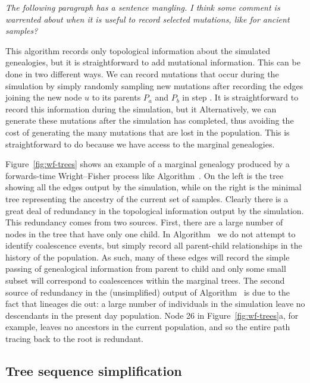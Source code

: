 \documentclass{article}
\newcommand{\krt}[1]{{\em \color{green} #1}}
\begin{document}
\krt{The following paragraph has a sentence mangling.  I think some comment is warrented about when it is useful to
record selected mutations, like for ancient samples?}

This algorithm records only topological information about the simulated genealogies,
but it is straightforward to add mutational information.
This can be done in two different ways.
We can record mutations that occur during the simulation by simply
randomly sampling new mutations after recording the edges joining the new node $u$ to its parents
$P_a$ and $P_b$ in step .
It is straightforward to record this information during the simulation, but it
Alternatively, we can generate these mutations after the simulation has completed, thus
avoiding the cost of generating the many mutations that are lost in the population.
This is straightforward to do because we have access to the marginal genealogies.

Figure~\ref{fig:wf-trees} shows
an example of a marginal genealogy produced by a forwards-time Wright--Fisher
process like Algorithm~.
On the left is the tree showing all the edges output by the simulation,
while on the right
is the minimal tree representing the ancestry of the current set of samples.
Clearly there is a great deal of redundancy in the topological
information output by the simulation.
This redundancy comes from two sources.
First, there are a large number of nodes in the tree that have only one child.
In Algorithm~ we do not attempt to identify coalescence events,
but simply record all parent-child
relationships in the history of the population.
As such, many of these edges
will record the simple passing of genealogical information from parent to child
and only some small subset will correspond to coalescences within the marginal
trees. The second source of redundancy in the (unsimplified) output of Algorithm~
is due to the fact that lineages die out: a large number of
individuals in the simulation leave no descendants in the present day population.
Node 26 in Figure~\ref{fig:wf-trees}a, for example, leaves no
ancestors in the current population, and so the entire path tracing back to
the root is redundant.

\subsection*{Tree sequence simplification}
\label{ss:simplify}
\end{document}
